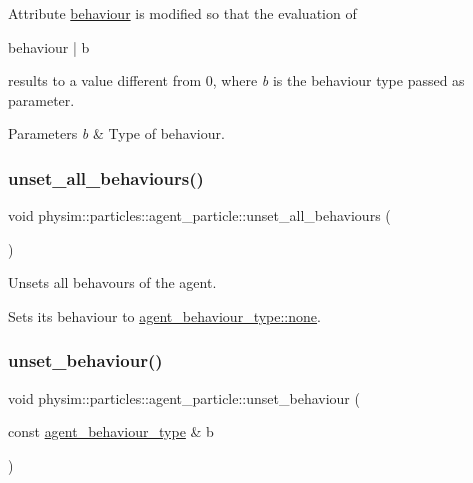 Attribute \hyperlink{classphysim_1_1particles_1_1agent__particle_af219e3f46630bb7f51f3d00952ed4f1c}{behaviour} is modified so that the evaluation of \begin{DoxyVerb}behaviour | b
\end{DoxyVerb}
 results to a value different from 0, where {\itshape b} is the behaviour type passed as parameter. 
\begin{DoxyParams}{Parameters}
{\em b} & Type of behaviour. \\
\hline
\end{DoxyParams}
\mbox{\label{classphysim_1_1particles_1_1agent__particle_a1707492909bba01164bf38186a68bcb7}} 
\subsubsection{\texorpdfstring{unset\+\_\+all\+\_\+behaviours()}{unset\_all\_behaviours()}}
{\footnotesize\ttfamily void physim\+::particles\+::agent\+\_\+particle\+::unset\+\_\+all\+\_\+behaviours (\begin{DoxyParamCaption}{ }\end{DoxyParamCaption})}



Unsets all behavours of the agent. 

Sets its behaviour to \hyperlink{namespacephysim_1_1particles_a033757595f7862a0fc8a389d79bf9c88a334c4a4c42fdb79d7ebc3e73b517e6f8}{agent\+\_\+behaviour\+\_\+type\+::none}. \mbox{\label{classphysim_1_1particles_1_1agent__particle_a903f5a9d1c34eed73dd5286e55e41b3d}} 
\subsubsection{\texorpdfstring{unset\+\_\+behaviour()}{unset\_behaviour()}}
{\footnotesize\ttfamily void physim\+::particles\+::agent\+\_\+particle\+::unset\+\_\+behaviour (\begin{DoxyParamCaption}\item[{const \hyperlink{namespacephysim_1_1particles_a033757595f7862a0fc8a389d79bf9c88}{agent\+\_\+behaviour\+\_\+type} \&}]{b }\end{DoxyParamCaption})}



